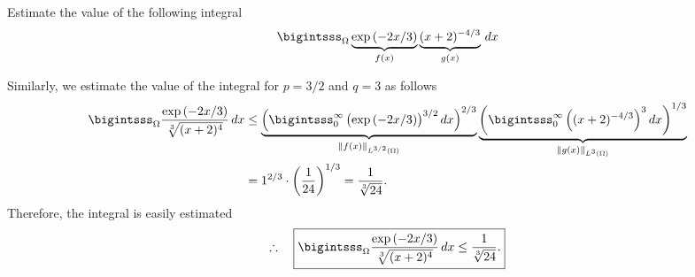 \documentclass[12pt]{article}
\begin{document}
\begin{exampleboxed}
	Estimate the value of the following integral
	\begin{align}
		\bigintsss_{\Omega} \underbrace{\exp{(-2x/3)}}_{f(x)} \underbrace{(x + 2)^{-4/3}}_{g(x)} \, dx
	\end{align}
\end{exampleboxed}
Similarly, we estimate the value of the integral for $p=3/2$ and $q=3$
as follows
\begin{align}
	\bigintsss_{\Omega} \frac{\exp{(-2x/3)}}{\sqrt[3]{(x + 2)^{4}}} \, dx
	 & \leq
	\underbrace{\left(\bigintsss_{0}^{\infty}\left(\exp{(-2x/3)}\right)^{3/2}dx\right)^{2/3}}_
	{\|f(x)\|_{L^{3/2}(\Omega)}}
	\underbrace{\left(\bigintsss_{0}^{\infty} \left((x + 2)^{-4/3}\right)^{3} dx\right)^{1/3}}
	_{\|g(x)\|_{L^{3}(\Omega)}} \notag \\
	 & =
	1^{2/3}\cdot
	\left(\frac{1}{24}\right)^{1/3}
	= \frac{1}{\sqrt[3]{24}}.
\end{align}
Therefore, the integral is easily estimated 
\begin{align}
	\therefore\quad\boxed{
		\bigintsss_{\Omega} \frac{\exp{(-2x/3)}}{\sqrt[3]{(x + 2)^{4}}} \, dx
		\leq
		\frac{1}{\sqrt[3]{24}}.
	}
\end{align}
\end{document}
